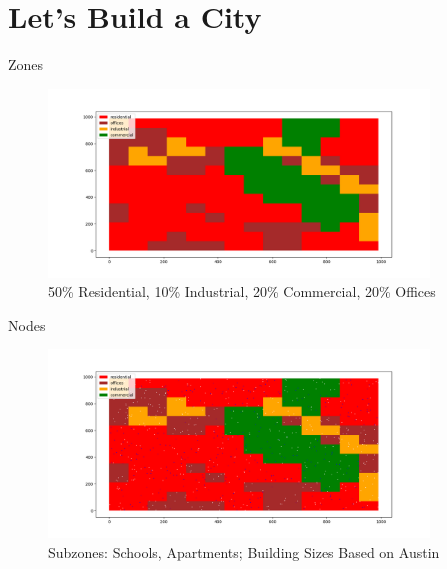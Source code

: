 \documentclass[10pt, aspectratio=169]{beamer}
\begin{document}
    \section{Let's Build a City}
    
    \begin{frame}{Zones}
        \begin{center}
            \begin{figure}
                \centering
                \includegraphics[height=5cm, keepaspectratio]{images/build_city/zones.png}
                \caption{50\% Residential, 10\% Industrial, 20\% Commercial, 20\% Offices}
            \end{figure}
        \end{center}
    \end{frame}
    
    \begin{frame}{Nodes}
        \begin{center}
            \begin{figure}
                \centering
                \includegraphics[height=5cm, keepaspectratio]{images/build_city/nodes.png}
                \caption{Subzones: Schools, Apartments; Building Sizes Based on Austin}
            \end{figure}
        \end{center}
    \end{frame}
    
\end{document}
